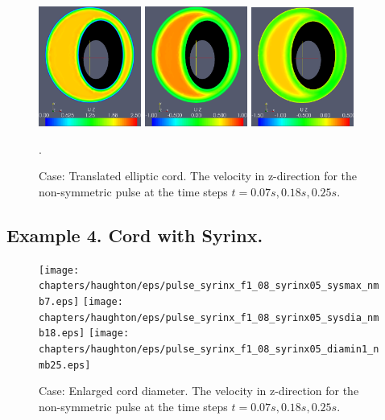 \begin{figure}\begin{center}
\includegraphics[width=0.3\textwidth]{chapters/haughton/eps/pulse_f1_08_elliptic_eccentric_sysmax_nmb7.eps}
\includegraphics[width=0.3\textwidth]{chapters/haughton/eps/pulse_f1_08_elliptic_eccentric_sysdia_nmb18.eps}
\includegraphics[width=0.3\textwidth]{chapters/haughton/eps/pulse_f1_08_elliptic_eccentric_diamin1_nmb25.eps}
\caption{Case: Translated elliptic cord. The velocity in z-direction for the non-symmetric pulse at the time steps $t=0.07s, 0.18s, 0.25s$.}
\label{fig:case3b}. 
\end{center}\end{figure}


\subsection{Example 4. Cord with Syrinx.} 
\begin{figure}\begin{center}
\texttt{[image: chapters/haughton/eps/pulse\_syrinx\_f1\_08\_syrinx05\_sysmax\_nmb7.eps]}
\texttt{[image: chapters/haughton/eps/pulse\_syrinx\_f1\_08\_syrinx05\_sysdia\_nmb18.eps]}
\texttt{[image: chapters/haughton/eps/pulse\_syrinx\_f1\_08\_syrinx05\_diamin1\_nmb25.eps]}
\caption{Case: Enlarged cord diameter. The velocity in z-direction for the non-symmetric pulse at the time steps $t=0.07s, 0.18s, 0.25s$.}
\label{fig:case4}
\end{center}\end{figure}

